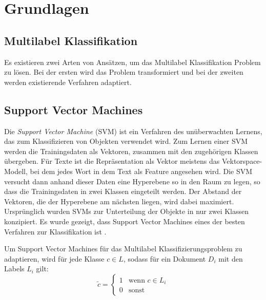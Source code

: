 \section{Grundlagen}
\subsection{Multilabel Klassifikation}
\label{sub:multilabel_klassifikation}
Es existieren zwei Arten von Ansätzen, um das Multilabel Klassifikation Problem zu lösen.
Bei der ersten wird das Problem transformiert und bei der zweiten werden existierende Verfahren adaptiert.

\subsection{Support Vector Machines}
\label{sub:support_vector_machines}
Die \emph{Support Vector Machine} (SVM) ist ein Verfahren des unüberwachten Lernens, das zum Klassifizieren von Objekten verwendet wird.
Zum Lernen einer SVM werden die Trainingsdaten als Vektoren, zusammen mit den zugehörigen Klassen übergeben.
Für Texte ist die Repräsentation als Vektor meistens das Vektorspace-Modell, bei dem jedes Wort in dem Text als Feature angesehen wird.
Die SVM versucht dann anhand dieser Daten eine Hyperebene so in den Raum zu legen, so dass die Trainingsdaten in zwei Klassen eingeteilt werden.
Der Abstand der Vektoren, die der Hyperebene am nächsten liegen, wird dabei maximiert.
Ursprünglich wurden SVMs zur Unterteilung der Objekte in nur zwei Klassen konzipiert.
Es wurde gezeigt, dass Support Vector Machines eines der besten Verfahren zur Klassifikation ist \cite{Joachims:1998:TCS:645326.649721}.







Um Support Vector Machines für das Multilabel Klassifizierungsproblem zu adaptieren, wird für jede Klasse $c \in L$, sodass für ein Dokument $D_i$ mit den Labels $L_i$ gilt:
\[
    \tilde c =
    \begin{cases}
        1 &\mbox{wenn } c \in L_i \\
        0 &\mbox{sonst}
    \end{cases}
\]

